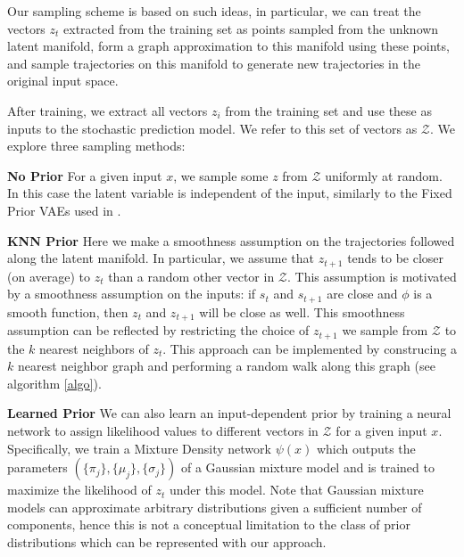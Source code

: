 \documentclass{article}
\begin{document}
Our sampling scheme is based on such ideas, in particular, we can treat the vectors $z_t$ extracted from the training set as points sampled from the unknown latent manifold, form a graph approximation to this manifold using these points, and sample trajectories on this manifold to generate new trajectories in the original input space.

After training, we extract all vectors $z_i$ from the training set and use these as inputs to the stochastic prediction model.
We refer to this set of vectors as $\mathcal{Z}$.
We explore three sampling methods:

\textbf{No Prior} For a given input $x$, we sample some $z$ from $\mathcal{Z}$ uniformly at random. In this case the latent variable is independent of the input, similarly to the Fixed Prior VAEs used in \citep{Denton18}.

\textbf{KNN Prior} Here we make a smoothness assumption on the trajectories followed along the latent manifold. In particular, we assume that $z_{t+1}$ tends to be closer (on average) to $z_t$ than a random other vector in $\mathcal{Z}$. This assumption is motivated by a smoothness assumption on the inputs: if $s_t$ and $s_{t+1}$ are close and $\phi$ is a smooth function, then $z_t$ and $z_{t+1}$ will be close as well. This smoothness assumption can be reflected by restricting the choice of $z_{t+1}$ we sample from $\mathcal{Z}$ to the $k$ nearest neighbors of $z_t$.
This approach can be implemented by construcing a $k$ nearest neighbor graph and performing a random walk along this graph (see algorithm \ref{algo}).

\textbf{Learned Prior} We can also learn an input-dependent prior by training a neural network to assign likelihood values to different vectors in $\mathcal{Z}$ for a given input $x$. Specifically, we train a Mixture Density network \citep{mixture-density-networks} $\psi(x)$ which outputs the parameters $(\{\pi_j\}, \{\mu_j\}, \{\sigma_j\})$ of a Gaussian mixture model and is trained to maximize the likelihood of $z_t$ under this model. Note that Gaussian mixture models can approximate arbitrary distributions given a sufficient number of components, hence this is not a conceptual limitation to the class of prior distributions which can be represented with our approach.
\end{document}
